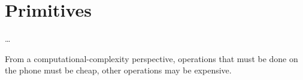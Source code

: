 \mode*

\section{Primitives}
\label{Primitives}

\dots

From a computational-complexity perspective, operations that must be done on 
the phone must be cheap, other operations may be expensive.
